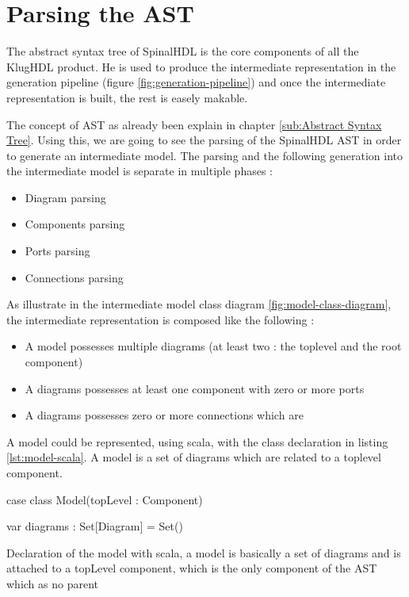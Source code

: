 \chapter{Parsing the AST}
\label{chap:parsing-ast}

The abstract syntax tree of SpinalHDL is the core components of all the KlugHDL
product. He is used to produce the intermediate representation in the generation
pipeline (figure \ref{fig:generation-pipeline}) and once the intermediate
representation is built, the rest is easely makable.

The concept of AST as already been explain in chapter \ref{sub:Abstract Syntax
  Tree}. Using this, we are going to see the parsing of the SpinalHDL AST in
order to generate an intermediate model. The parsing and the following
generation into the intermediate model is separate in multiple
phases :

\begin{itemize}
\item Diagram parsing
\item Components parsing
\item Ports parsing
\item Connections parsing
\end{itemize}

As illustrate in the intermediate model class diagram
\ref{fig:model-class-diagram}, the intermediate representation is composed like
the following :
\begin{itemize}
\item A model possesses multiple diagrams (at least two : the toplevel and the
  root component)
\item A diagrams possesses at least one component with zero or more ports
\item A diagrams possesses zero or more connections which are 
\end{itemize}

A model could be represented, using scala, with the class declaration in listing
\ref{lst:model-scala}. A model is a set of diagrams which are related to a
toplevel component.

\begin{listing}[H]
  \centering
  \begin{scalacode}
    case class Model(topLevel : Component) {

      var diagrams : Set[Diagram] = Set()
  }
\end{scalacode}
\caption[Model class declaration]{Declaration of the model with scala, a model
  is basically a set of diagrams and is attached to a topLevel component, which
  is the only component of the AST which as no parent}
\label{lst:model-scala}
\end{listing}

